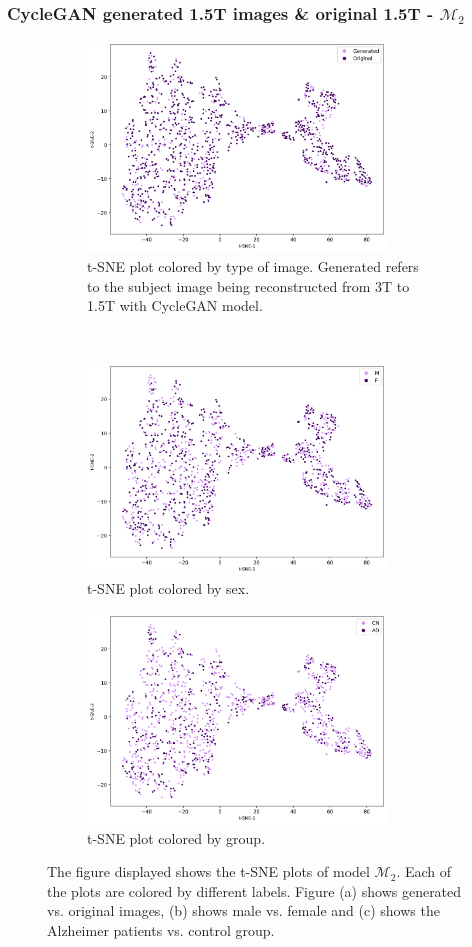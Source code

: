 \documentclass[11pt, fleqn, titlepage]{article}
\newcommand{\1}[1]{\mathds{1}\left[#1\right]}
\begin{document}
\subsubsection{CycleGAN generated 1.5T images \& original 1.5T -  $ \mathcal M_2 $}

\begin{figure}[H]
	\centering
	\begin{subfigure}[t]{0.62\textwidth}
		\centering
		\includegraphics[height=2.2in]{imgs/classifier/overfit_with_generated_imgs_all_datatsne_type}%
		\caption{t-SNE plot colored by type of image. Generated refers to the subject image being reconstructed from 3T to 1.5T with CycleGAN model.}
	\end{subfigure}%
	~
	\begin{subfigure}[t]{0.5\textwidth}
		\centering
		\includegraphics[height=2.2in]{imgs/classifier/overfit_with_generated_imgs_all_datatsne_sex}%
		\caption{t-SNE plot colored by sex.}	
	\end{subfigure}
	\begin{subfigure}[t]{0.5\textwidth}
		\centering
		\includegraphics[height=2.2in]{imgs/classifier/overfit_with_generated_imgs_all_datatsne_group}%
		\caption{t-SNE plot colored by group.}
	\end{subfigure}
	\caption{The figure displayed shows the t-SNE plots of model $ \mathcal M_2 $. Each of the plots are colored by different labels. Figure (a) shows generated vs. original images, (b) shows male vs. female and (c) shows the Alzheimer patients vs. control group. }
	\label{fig:tsne_gen_overfit}
\end{figure}
\end{document}
